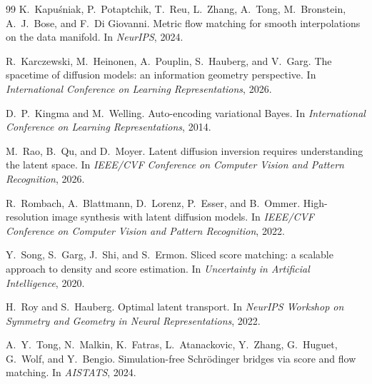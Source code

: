 \documentclass[uplatex,dvipdfmx,11pt,a4paper]{jsarticle}
\begin{document}
\begin{thebibliography}{99}
K.~Kapu\'sniak, P.~Potaptchik, T.~Reu, L.~Zhang, A.~Tong, M.~Bronstein,
A.~J.~Bose, and F.~Di Giovanni.
\newblock Metric flow matching for smooth interpolations on the data manifold.
\newblock In \emph{NeurIPS}, 2024.

R.~Karczewski, M.~Heinonen, A.~Pouplin, S.~Hauberg, and V.~Garg.
\newblock The spacetime of diffusion models: an information geometry perspective.
\newblock In \emph{International Conference on Learning Representations}, 2026.

D.~P.~Kingma and M.~Welling.
\newblock Auto-encoding variational Bayes.
\newblock In \emph{International Conference on Learning Representations}, 2014.

M.~Rao, B.~Qu, and D.~Moyer.
\newblock Latent diffusion inversion requires understanding the latent space.
\newblock In \emph{IEEE/CVF Conference on Computer Vision and Pattern Recognition}, 2026.

R.~Rombach, A.~Blattmann, D.~Lorenz, P.~Esser, and B.~Ommer.
\newblock High-resolution image synthesis with latent diffusion models.
\newblock In \emph{IEEE/CVF Conference on Computer Vision and Pattern Recognition}, 2022.

Y.~Song, S.~Garg, J.~Shi, and S.~Ermon.
\newblock Sliced score matching: a scalable approach to density and score estimation.
\newblock In \emph{Uncertainty in Artificial Intelligence}, 2020.

H.~Roy and S.~Hauberg.
\newblock Optimal latent transport.
\newblock In \emph{NeurIPS Workshop on Symmetry and Geometry in Neural Representations}, 2022.

A.~Y.~Tong, N.~Malkin, K.~Fatras, L.~Atanackovic, Y.~Zhang, G.~Huguet,
G.~Wolf, and Y.~Bengio.
\newblock Simulation-free Schr\"odinger bridges via score and flow matching.
\newblock In \emph{AISTATS}, 2024.

\end{thebibliography}
\end{document}
